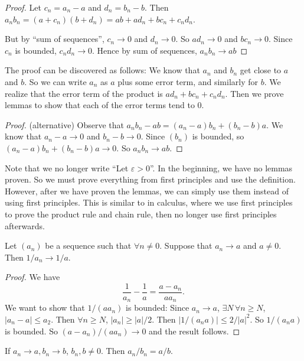 \documentclass[a4paper]{article}
\begin{document}
\begin{proof}
  Let $c_n = a_n - a$ and $d_n = b_n - b$. Then $a_nb_n = (a + c_n)(b + d_n) = ab + ad_n + bc_n + c_nd_n$.

  But by ``sum of sequences'', $c_n \to 0$ and $d_n \to 0$. So $ad_n \to 0$ and $bc_n\to 0$. Since $c_n$ is bounded, $c_nd_n \to 0$. Hence by sum of sequences, $a_nb_n \to ab$
\end{proof}

The proof can be discovered as follows: We know that $a_n$ and $b_n$ get close to $a$ and $b$. So we can write $a_n$ as $a$ plus some error term, and similarly for $b$. We realize that the error term of the product is $ad_n + bc_n + c_nd_n$. Then we prove lemmas to show that each of the error terms tend to 0.

\begin{proof}
  (alternative) Observe that $a_nb_n - ab = (a_n - a) b_n + (b_n - b)a$. We know that $a_n - a \to 0$ and $b_n - b\to 0$. Since $(b_n)$ is bounded, so $(a_n - a)b_n + (b_n - b)a \to 0$. So $a_nb_n \to ab$.
\end{proof}

Note that we no longer write ``Let $\varepsilon > 0$''. In the beginning, we have no lemmas proven. So we must prove everything from first principles and use the definition. However, after we have proven the lemmas, we can simply use them instead of using first principles. This is similar to in calculus, where we use first principles to prove the product rule and chain rule, then no longer use first principles afterwards.

\begin{lemma}
  Let $(a_n)$ be a sequence such that $\forall n \not= 0$. Suppose that $a_n \to a$ and $a\not = 0$. Then $1/a_n \to 1/a$.
\end{lemma}

\begin{proof}
  We have
  \[
    \frac{1}{a_n} - \frac{1}{a} = \frac{a - a_n}{aa_n}.
  \]
  We want to show that $1/(aa_n)$ is bounded: Since $a_n \to a$, $\exists N\, \forall n\geq N$, $|a_n - a| \leq a_2$. Then $\forall n\geq N$, $|a_n| \geq |a|/2$. Then $|1/(a_na)| \leq 2/|a|^2$. So $1/(a_na)$ is bounded. So $(a - a_n)/(aa_n)\to 0$ and the result follows.
\end{proof}

\begin{cor}
  If $a_n \to a, b_n \to b$, $b_n, b\not= 0$. Then $a_n/b_n = a/b$.
\end{cor}
\end{document}
